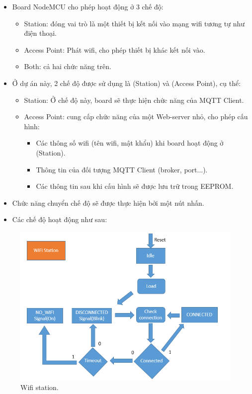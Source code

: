 \documentclass[a4paper,12pt,oneside]{article}
\begin{document}
	\begin{itemize}
	\item	Board NodeMCU cho phép hoạt động ở 3 chế độ:
		\begin{itemize}
		\item	Station: đóng vai trò là một thiết bị kết nối vào mạng wifi tương tự như điện thoại.
		\item	Access Point: Phát wifi, cho phép thiết bị khác kết nối vào.
		\item	Both: cả hai chức năng trên.
		\end{itemize}

	\item	Ở dự án này, 2 chế độ được sử dụng là (Station) và (Access Point), cụ thể:
		\begin{itemize}
		\item	Station: Ở chế độ này, board sẽ thực hiện chức năng của MQTT Client.
		\item	Access Point: cung cấp chức năng của một Web-server nhỏ, cho phép cấu hình:
			\begin{itemize}
				\item	Các thông  số wifi (tên wifi, mật khẩu) khi board hoạt động ở (Station). 
				\item	Thông tin của đối tượng MQTT Client (broker, port...).
				\item	Các thông tin sau khi cấu hình sẽ được lưu trữ trong EEPROM.
			\end{itemize}
		\end{itemize}


	\item	Chức năng chuyển chế độ sẽ được thực hiện bởi một nút nhấn.
	\item	Các chế độ hoạt động như sau:\\

	\end{itemize}
		
			\begin{figure}[H]
				\centering
				\includegraphics[scale=.6]{hinh/wifi_station.PNG}
				\caption{Wifi station.}
			\end{figure}
		
\end{document}

